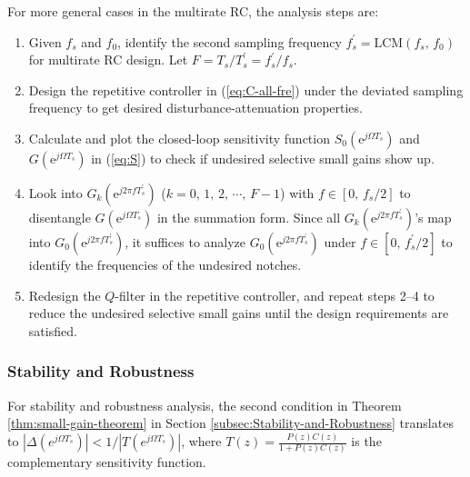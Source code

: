 \documentclass [11pt, proquest] {uwthesis}[2020/02/24]
\begin{document}
For more general cases in the multirate RC, the analysis steps are:
\begin{enumerate}
\item Given $f_{s}$ and $f_{0}$, identify the second sampling frequency
$f_{s}^{'}=\text{LCM}(f_{s},\,f_{0})$ for multirate RC design. Let
$F=T_{s}/T_{s}^{'}=f_{s}^{'}/f_{s}$.
\item Design the repetitive controller in (\ref{eq:C-all-fre}) under the
deviated sampling frequency to get desired disturbance-attenuation
properties.
\item Calculate and plot the closed-loop sensitivity function $S_{0}(\text{e}^{j\Omega T_{s}})$
and $G(\text{e}^{j\Omega T_{s}})$ in (\ref{eq:S}) to check if undesired
selective small gains show up.
\item Look into $G_{k}(\text{e}^{j2\pi fT_{s}^{'}})$ ($k=0,\,1,\,2,\,\cdots,\,F-1$)
with $f\in[0,\,f_{s}/2]$ to disentangle $G(\text{e}^{j\Omega T_{s}})$
in the summation form. Since all $G_{k}(\text{e}^{j2\pi fT_{s}^{'}})$'s
map into $G_{0}(\text{e}^{j2\pi fT_{s}^{'}})$, it suffices to analyze
$G_{0}(\text{e}^{j2\pi fT_{s}^{'}})$ under $f\in[0,\,f_{s}^{'}/2]$
to identify the frequencies of the undesired notches.
\item Redesign the $Q$-filter in the repetitive controller, and repeat
steps 2–4 to reduce the undesired selective small gains until the
design requirements are satisfied. 
\end{enumerate}

\subsubsection{Stability and Robustness} \label{sssec:Stability-and-robustness}

For stability and robustness analysis, the second condition in Theorem \ref{thm:small-gain-theorem} in Section \ref{subsec:Stability-and-Robustness} translates to $|\Delta(e^{j\Omega T_{s}})|<1/|T(e^{j\Omega T_{s}})|$, where $T(z)=\frac{P(z)C(z)}{1+P(z)C(z)}$ is the complementary sensitivity
function.
\end{document}
